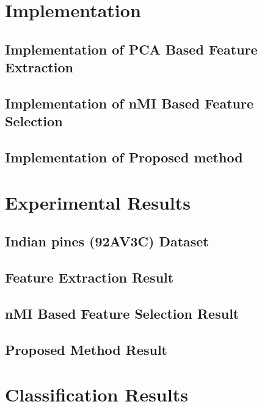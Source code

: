 \documentclass[document.tex]{subfiles}
\begin{document}
\section{Implementation}

\subsection{Implementation of PCA Based Feature Extraction}

\subsection{Implementation of nMI Based Feature Selection}

\subsection{Implementation of Proposed method}

\section{Experimental Results}

\subsection{Indian pines (92AV3C) Dataset}
\subsection{Feature Extraction Result}
\subsection{nMI Based Feature Selection Result}
\subsection{Proposed Method Result}
\section{Classification Results}
\end{document}
